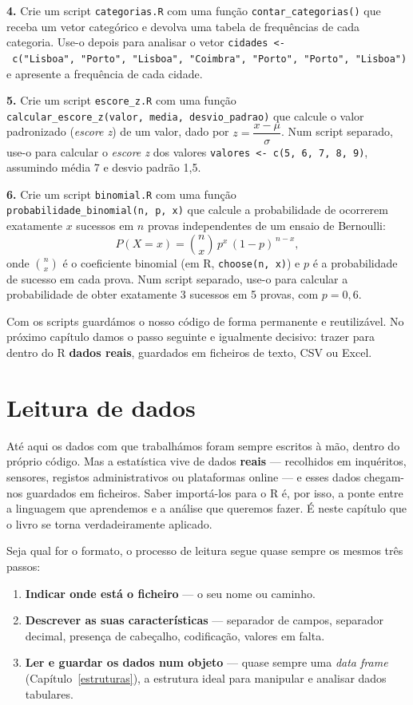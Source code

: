 \documentclass[
  portuguese,
  11pt,
  openany]{book}
\providecommand{\tightlist}{%
  \setlength{\itemsep}{0pt}\setlength{\parskip}{0pt}}
\begin{document}
\textbf{4.} Crie um script \texttt{categorias.R} com uma função \texttt{contar\_categorias()} que
receba um vetor categórico e devolva uma tabela de frequências de cada categoria.
Use-o depois para analisar o vetor
\texttt{cidades\ \textless{}-\ c("Lisboa",\ "Porto",\ "Lisboa",\ "Coimbra",\ "Porto",\ "Porto",\ "Lisboa")}
e apresente a frequência de cada cidade.

\textbf{5.} Crie um script \texttt{escore\_z.R} com uma função
\texttt{calcular\_escore\_z(valor,\ media,\ desvio\_padrao)} que calcule o valor padronizado
(\emph{escore z}) de um valor, dado por \(z = \dfrac{x - \mu}{\sigma}\). Num script
separado, use-o para calcular o \emph{escore z} dos valores
\texttt{valores\ \textless{}-\ c(5,\ 6,\ 7,\ 8,\ 9)}, assumindo média 7 e desvio padrão 1,5.

\textbf{6.} Crie um script \texttt{binomial.R} com uma função \texttt{probabilidade\_binomial(n,\ p,\ x)}
que calcule a probabilidade de ocorrerem exatamente \(x\) sucessos em \(n\) provas
independentes de um ensaio de Bernoulli:
\[P(X = x) = \binom{n}{x}\, p^{x}\, (1 - p)^{\,n - x},\]
onde \(\binom{n}{x}\) é o coeficiente binomial (em R, \texttt{choose(n,\ x)}) e \(p\) é a
probabilidade de sucesso em cada prova. Num script separado, use-o para calcular a
probabilidade de obter exatamente 3 sucessos em 5 provas, com \(p = 0{,}6\).

Com os scripts guardámos o nosso código de forma permanente e reutilizável. No
próximo capítulo damos o passo seguinte e igualmente decisivo: trazer para dentro do
R \textbf{dados reais}, guardados em ficheiros de texto, CSV ou Excel.

\chapter{Leitura de dados}\label{leitura}

Até aqui os dados com que trabalhámos foram sempre escritos à mão, dentro do próprio
código. Mas a estatística vive de dados \textbf{reais} --- recolhidos em inquéritos,
sensores, registos administrativos ou plataformas online --- e esses dados chegam-nos
guardados em ficheiros. Saber importá-los para o R é, por isso, a ponte entre a
linguagem que aprendemos e a análise que queremos fazer. É neste capítulo que o
livro se torna verdadeiramente aplicado.

Seja qual for o formato, o processo de leitura segue quase sempre os mesmos três
passos:

\begin{enumerate}
\def\labelenumi{\arabic{enumi}.}
\tightlist
\item
  \textbf{Indicar onde está o ficheiro} --- o seu nome ou caminho.
\item
  \textbf{Descrever as suas características} --- separador de campos, separador decimal,
  presença de cabeçalho, codificação, valores em falta.
\item
  \textbf{Ler e guardar os dados num objeto} --- quase sempre uma \emph{data frame}
  (Capítulo~\ref{estruturas}), a estrutura ideal para manipular e analisar
  dados tabulares.
\end{enumerate}
\end{document}
